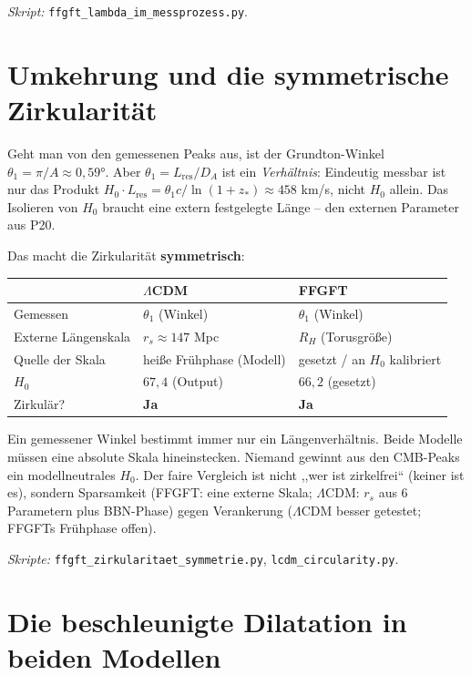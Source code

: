 \emph{Skript:} \texttt{ffgft\_lambda\_im\_messprozess.py}.

\section{Umkehrung und die symmetrische Zirkularität}

Geht man von den gemessenen Peaks aus, ist der Grundton-Winkel
$\theta_1 = \pi/A \approx 0{,}59°$. Aber $\theta_1 = L_\mathrm{res}/D_A$ ist
ein \emph{Verhältnis}: Eindeutig messbar ist nur das Produkt
$H_0 \cdot L_\mathrm{res} = \theta_1 c/\ln(1+z_*) \approx 458$ km/s, nicht
$H_0$ allein. Das Isolieren von $H_0$ braucht eine extern festgelegte Länge --
den externen Parameter aus P20.

Das macht die Zirkularität \textbf{symmetrisch}:
\begin{center}
\begin{tabular}{p{3.5cm}p{4cm}p{4cm}}
\toprule
 & \textbf{$\Lambda$CDM} & \textbf{FFGFT} \\
\midrule
Gemessen & $\theta_1$ (Winkel) & $\theta_1$ (Winkel) \\
Externe Längenskala & $r_s \approx 147$ Mpc & $R_H$ (Torusgröße) \\
Quelle der Skala & heiße Frühphase (Modell) & gesetzt / an $H_0$ kalibriert \\
$H_0$ & $67{,}4$ (Output) & $66{,}2$ (gesetzt) \\
Zirkulär? & \textbf{Ja} & \textbf{Ja} \\
\bottomrule
\end{tabular}
\end{center}

Ein gemessener Winkel bestimmt immer nur ein Längenverhältnis. Beide Modelle
müssen eine absolute Skala hineinstecken. Niemand gewinnt aus den CMB-Peaks
ein modellneutrales $H_0$. Der faire Vergleich ist nicht ,,wer ist
zirkelfrei`` (keiner ist es), sondern Sparsamkeit (FFGFT: eine externe Skala;
$\Lambda$CDM: $r_s$ aus 6 Parametern plus BBN-Phase) gegen Verankerung
($\Lambda$CDM besser getestet; FFGFTs Frühphase offen).

\emph{Skripte:} \texttt{ffgft\_zirkularitaet\_symmetrie.py},
\texttt{lcdm\_circularity.py}.


\section{Die beschleunigte Dilatation in beiden Modellen}

